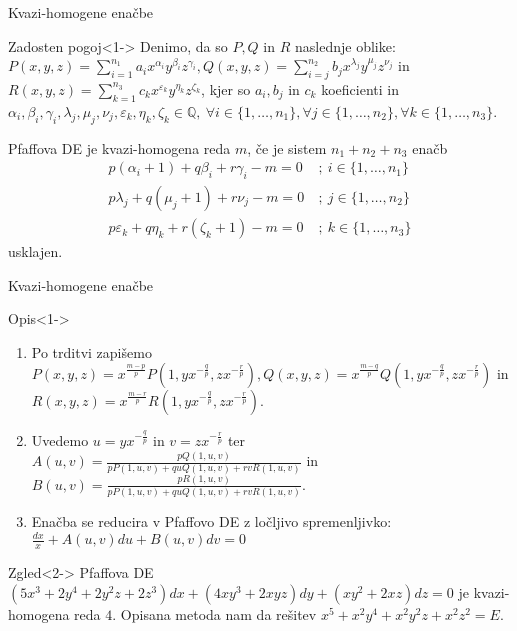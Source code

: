 \documentclass[t, 8pt]{beamer} %
\newcommand{\mth}[1]{\ensuremath{\mathbb{#1}}}
\newcommand{\Q}{\mth{Q}}
\newcommand{\fillblack}[1]{
	\begin{tikzpicture}[remember picture, overlay]
		\node [shift={(0 cm,0cm)}]  at (current page.south west)
		{%
			\begin{tikzpicture}[remember picture, overlay] at (current page.south west)
				\draw [fill=black] (0, 0) -- (0,#1 \paperheight) --
				(\paperwidth,#1 \paperheight) -- (\paperwidth,0) -- cycle ;
			\end{tikzpicture}
		};
		\draw (current page.north west) rectangle (current page.south east);
	\end{tikzpicture}
}
\begin{document}
		\begin{frame}{Kvazi-homogene enačbe}
			\begin{block}{Zadosten pogoj}<1->
				Denimo, da so $P, Q$ in $R$ naslednje oblike: 
					$P(x, y, z) = \sum_{i = 1}^{n_1}a_ix^{\alpha_i}y^{\beta_i}z^{\gamma_i},
					Q(x, y, z) = \sum_{i = j}^{n_2}b_jx^{\lambda_j}y^{\mu_j}z^{\nu_j}$ in
					$R(x, y, z) = \sum_{k = 1}^{n_3}c_kx^{\varepsilon_k}y^{\eta_k}z^{\zeta_k}$, kjer so $a_i, b_j$ in $c_k$ koeficienti in $\alpha_i, \beta_i, \gamma_i, \lambda_j, \mu_j, \nu_j, \varepsilon_k, \eta_k, \zeta_k\in \Q,~ \forall i\in \{1,\ldots, n_1\}, \forall j\in \{1,\ldots, n_2\}, \forall k\in \{1,\ldots, n_3\}$.
				
				Pfaffova DE je kvazi-homogena reda $m$, če je sistem $n_1 + n_2 + n_3$ enačb \begin{align*}
					p(\alpha_i+1) + q\beta_i + r\gamma_i - m = 0~&;~ i\in \{1, \ldots, n_1\} \\
					p\lambda_j + q(\mu_j+1) + r\nu_j - m= 0~&;~ j\in \{1, \ldots, n_2\} \\
					p\varepsilon_k + q\eta_k + r(\zeta_k+1) - m=0~&;~ k\in \{1, \ldots, n_3\}
				\end{align*} usklajen.
			\end{block}
		\end{frame}
		
		\begin{frame}{Kvazi-homogene enačbe}
			\begin{block}{Opis}<1->
				\begin{enumerate}
					\item Po trditvi zapišemo
						$P(x, y, z) = x^{\frac{m-p}{p}}P(1, yx^{-\frac{q}{p}}, zx^{-\frac{r}{p}}),
						Q(x, y, z) = x^{\frac{m-q}{p}}Q(1, yx^{-\frac{q}{p}}, zx^{-\frac{r}{p}})$ in
						$R(x, y, z) = x^{\frac{m-r}{p}}R(1, yx^{-\frac{q}{p}}, zx^{-\frac{r}{p}})$.
					\item Uvedemo $u = yx^{-\frac{q}{p}}$ in $v = zx^{-\frac{r}{p}}$ ter $A(u, v) = \frac{pQ(1, u, v)}{pP(1, u, v) + quQ(1, u, v) + rvR(1, u, v)}$ in $B(u, v) = \frac{pR(1, u, v)}{pP(1, u, v) + quQ(1, u, v) + rvR(1, u, v)}$.
					\item Enačba se reducira v Pfaffovo DE z ločljivo spremenljivko: $\frac{dx}{x} + A(u, v)du + B(u, v)dv = 0$
				\end{enumerate}
			\end{block}
			
			\begin{block}{Zgled}<2->
				Pfaffova DE $(5x^3 + 2y^4 + 2y^2z + 2z^3)dx + (4xy^3 + 2xyz)dy + (xy^2 + 2xz)dz = 0$ je kvazi-homogena reda $4$. Opisana metoda nam da rešitev $x^5 + x^2y^4 + x^2y^2z + x^2z^2 = E$.
			\end{block}
		\end{frame}
		
\end{document}
